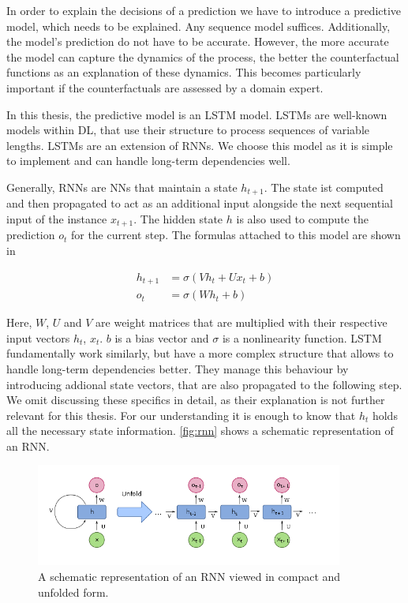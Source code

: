 \documentclass[./../../paper.tex]{subfiles}
\begin{document}
In order to explain the decisions of a prediction we have to introduce a predictive model, which needs to be explained. Any sequence model suffices. Additionally, the model's prediction do not have to be accurate. However, the more accurate the model can capture the dynamics of the process, the better the counterfactual functions as an explanation of these dynamics. This becomes particularly important if the counterfactuals are assessed by a domain expert. 

In this thesis, the predictive model is an \gls{LSTM} model. LSTMs are well-known models within \gls{DL}, that use their structure to process sequences of variable lengths\autocite{hochreiter_LongShortTermMemory_1997}. LSTMs are an extension of \glspl{RNN}. We choose this model as it is simple to implement and can handle long-term dependencies well.

Generally, \glspl{RNN} are \glspl{NN} that maintain a state $h_{t+1}$. The state ist computed and then propagated to act as an additional input alongside the next sequential input of the instance $x_{t+1}$. The hidden state $h$ is also used to compute the prediction $o_{t}$ for the current step. The formulas attached to this model are shown in 

\begin{align}
    \label{eq:rnn}
    h_{t+1} &= \sigma(V h_t + U x_t + b)\\
    o_{t} &= \sigma(W h_t + b)
\end{align}

Here, $W$, $U$ and $V$ are weight matrices that are multiplied with their respective input vectors $h_t$, $x_t$. $b$ is a bias vector and $\sigma$ is a nonlinearity function. LSTM fundamentally work similarly, but have a more complex structure that allows to handle long-term dependencies better. They manage this behaviour by introducing addional state vectors, that are also propagated to the following step. We omit discussing these specifics in detail, as their explanation is not further relevant for this thesis. For our understanding it is enough to know that $h_t$ holds all the necessary state information. \autoref{fig:rnn} shows a schematic representation of an RNN.   

\begin{figure}[htb]
    \centering
    \includegraphics[width=0.9\textwidth]{figures/rnn.png}
    \caption{A schematic representation of an RNN viewed in compact and unfolded form.}
    \label{fig:rnn}
\end{figure}
\end{document}
